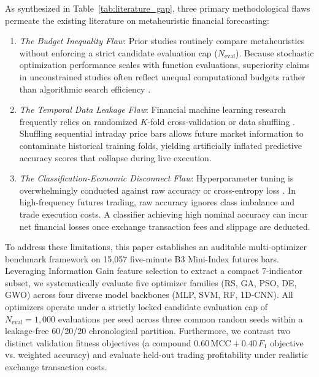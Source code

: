 As synthesized in Table~\ref{tab:literature_gap}, three primary methodological flaws permeate the existing literature on metaheuristic financial forecasting:
\begin{enumerate}
    \item \textit{The Budget Inequality Flaw}: Prior studies routinely compare metaheuristics without enforcing a strict candidate evaluation cap ($N_{\mathrm{eval}}$). Because stochastic optimization performance scales with function evaluations, superiority claims in unconstrained studies often reflect unequal computational budgets rather than algorithmic search efficiency \cite{dhingra2025solar, ecer2020mlp_ga_pso}.
    \item \textit{The Temporal Data Leakage Flaw}: Financial machine learning research frequently relies on randomized $K$-fold cross-validation or data shuffling \cite{simatupang2026stock, makridakis2018statistical}. Shuffling sequential intraday price bars allows future market information to contaminate historical training folds, yielding artificially inflated predictive accuracy scores that collapse during live execution.
    \item \textit{The Classification-Economic Disconnect Flaw}: Hyperparameter tuning is overwhelmingly conducted against raw accuracy or cross-entropy loss \cite{chicco2020mcc, anonymous2025precursor}. In high-frequency futures trading, raw accuracy ignores class imbalance and trade execution costs. A classifier achieving high nominal accuracy can incur net financial losses once exchange transaction fees and slippage are deducted.
\end{enumerate}

To address these limitations, this paper establishes an auditable multi-optimizer benchmark framework on 15,057 five-minute B3 Mini-Index futures bars. Leveraging Information Gain feature selection to extract a compact 7-indicator subset, we systematically evaluate five optimizer families (RS, GA, PSO, DE, GWO) across four diverse model backbones (MLP, SVM, RF, 1D-CNN). All optimizers operate under a strictly locked candidate evaluation cap of $N_{\mathrm{eval}} = 1{,}000$ evaluations per seed across three common random seeds within a leakage-free 60/20/20 chronological partition. Furthermore, we contrast two distinct validation fitness objectives (a compound $0.60\,\mathrm{MCC} + 0.40\,F_1$ objective vs. weighted accuracy) and evaluate held-out trading profitability under realistic exchange transaction costs.
